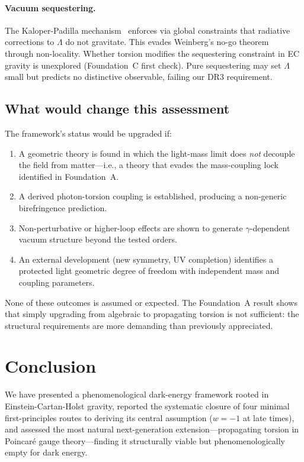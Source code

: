 \documentclass[aps,prd,twocolumn,superscriptaddress,showpacs,preprintnumbers,
  nofootinbib,longbibliography,floatfix]{revtex4-2}
\newcommand{\BI}{\gamma}
\begin{document}
\paragraph{Vacuum sequestering.}
The Kaloper-Padilla mechanism~\cite{KaloPerPadilla2014} enforces via
global constraints that radiative corrections to $\Lambda$ do not
gravitate. This evades Weinberg's no-go theorem~\cite{Weinberg1989}
through non-locality. Whether torsion modifies the sequestering
constraint in EC gravity is unexplored (Foundation~C first check).
Pure sequestering may set $\Lambda$ small but predicts no distinctive
observable, failing our DR3 requirement.

\subsection{What would change this assessment}

The framework's status would be upgraded if:
\begin{enumerate}
  \item A geometric theory is found in which the light-mass limit does
    \textit{not} decouple the field from matter---i.e., a theory that
    evades the mass-coupling lock identified in Foundation~A.
  \item A derived photon-torsion coupling is established, producing a
    non-generic birefringence prediction.
  \item Non-perturbative or higher-loop effects are shown to generate
    $\BI$-dependent vacuum structure beyond the tested orders.
  \item An external development (new symmetry, UV completion) identifies
    a protected light geometric degree of freedom with independent
    mass and coupling parameters.
\end{enumerate}
None of these outcomes is assumed or expected. The Foundation~A result
shows that simply upgrading from algebraic to propagating torsion is not
sufficient: the structural requirements are more demanding than
previously appreciated.


\section{Conclusion}\label{sec:conclusions}

We have presented a phenomenological dark-energy framework rooted in
Einstein-Cartan-Holst gravity, reported the systematic closure of four
minimal first-principles routes to deriving its central assumption
($w = -1$ at late times), and assessed the most natural next-generation
extension---propagating torsion in Poincar\'e gauge theory---finding it
structurally viable but phenomenologically empty for dark energy.
\end{document}
